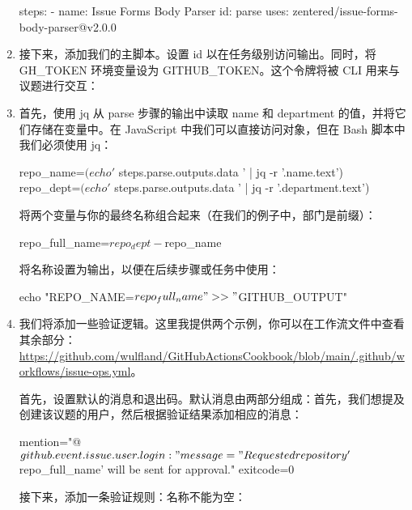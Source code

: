 \begin{enumerate}
\begin{shell}
steps:
  - name: Issue Forms Body Parser
    id: parse
    uses: zentered/issue-forms-body-parser@v2.0.0
\end{shell}

\item 
接下来，添加我们的主脚本。设置 id 以在任务级别访问输出。同时，将 GH\_TOKEN 环境变量设为 GITHUB\_TOKEN。这个令牌将被 CLI 用来与议题进行交互：


\item 
首先，使用 jq 从 parse 步骤的输出中读取 name 和 department 的值，并将它们存储在变量中。在 JavaScript 中我们可以直接访问对象，但在 Bash 脚本中我们必须使用 jq：

\begin{shell}
repo_name=$(echo '${{ steps.parse.outputs.data }}' | jq -r '.name.text')
repo_dept=$(echo '${{ steps.parse.outputs.data }}' | jq -r '.department.text')
\end{shell}

将两个变量与你的最终名称组合起来（在我们的例子中，部门是前缀）：

\begin{shell}
repo_full_name=$repo_dept-$repo_name
\end{shell}

将名称设置为输出，以便在后续步骤或任务中使用：

\begin{shell}
echo "REPO_NAME=$repo_full_name" >> "$GITHUB_OUTPUT"
\end{shell}

\item 
我们将添加一些验证逻辑。这里我提供两个示例，你可以在工作流文件中查看其余部分：\url{https://github.com/wulfland/GitHubActionsCookbook/blob/main/.github/workflows/issue-ops.yml}。

首先，设置默认的消息和退出码。默认消息由两部分组成：首先，我们想提及创建该议题的用户，然后根据验证结果添加相应的消息：

\begin{shell}
mention="@${{ github.event.issue.user.login }}: "
message="Requested repository '$repo_full_name' will be sent for approval."
exitcode=0
\end{shell}

接下来，添加一条验证规则：名称不能为空：


\end{enumerate}
